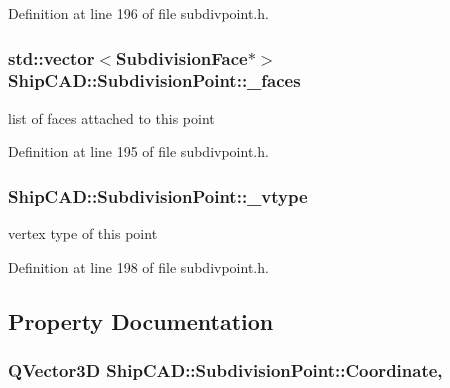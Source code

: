 Definition at line 196 of file subdivpoint.\-h.

\hypertarget{classShipCAD_1_1SubdivisionPoint_ace13688b5e2ad09c8d3f37cc0eaaaa52}{
\subsubsection[{\-\_\-faces}]{\setlength{\rightskip}{0pt plus 5cm}std\-::vector$<${\bf Subdivision\-Face}$\ast$$>$ Ship\-C\-A\-D\-::\-Subdivision\-Point\-::\-\_\-faces\hspace{0.3cm}{\ttfamily [protected]}}}\label{classShipCAD_1_1SubdivisionPoint_ace13688b5e2ad09c8d3f37cc0eaaaa52}
list of faces attached to this point 

Definition at line 195 of file subdivpoint.\-h.

\hypertarget{classShipCAD_1_1SubdivisionPoint_a37f4626c2c18a4838f693464d93ad291}{
\subsubsection[{\-\_\-vtype}]{ Ship\-C\-A\-D\-::\-Subdivision\-Point\-::\-\_\-vtype\hspace{0.3cm}{\ttfamily [protected]}}}\label{classShipCAD_1_1SubdivisionPoint_a37f4626c2c18a4838f693464d93ad291}
vertex type of this point 

Definition at line 198 of file subdivpoint.\-h.



\subsection{Property Documentation}
\hypertarget{classShipCAD_1_1SubdivisionPoint_a5d39b6f7fe221b5848835a0957702c84}{
\subsubsection[{Coordinate}]{\setlength{\rightskip}{0pt plus 5cm}Q\-Vector3\-D Ship\-C\-A\-D\-::\-Subdivision\-Point\-::\-Coordinate\hspace{0.3cm}{\ttfamily [read]}, {\ttfamily [write]}}}\label{classShipCAD_1_1SubdivisionPoint_a5d39b6f7fe221b5848835a0957702c84}


